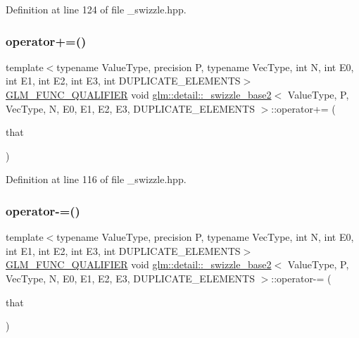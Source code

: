 Definition at line 124 of file \+\_\+swizzle.\+hpp.

\mbox{\label{structglm_1_1detail_1_1__swizzle__base2_a5e734b2e9da294d92bb347a3c7f44ded}} 
\subsubsection{\texorpdfstring{operator+=()}{operator+=()}}
{\footnotesize\ttfamily template$<$typename Value\+Type, precision P, typename Vec\+Type, int N, int E0, int E1, int E2, int E3, int D\+U\+P\+L\+I\+C\+A\+T\+E\+\_\+\+E\+L\+E\+M\+E\+N\+TS$>$ \\
\hyperlink{setup_8hpp_a33fdea6f91c5f834105f7415e2a64407}{G\+L\+M\+\_\+\+F\+U\+N\+C\+\_\+\+Q\+U\+A\+L\+I\+F\+I\+ER} void \hyperlink{structglm_1_1detail_1_1__swizzle__base2}{glm\+::detail\+::\+\_\+swizzle\+\_\+base2}$<$ Value\+Type, P, Vec\+Type, N, E0, E1, E2, E3, D\+U\+P\+L\+I\+C\+A\+T\+E\+\_\+\+E\+L\+E\+M\+E\+N\+TS $>$\+::operator+= (\begin{DoxyParamCaption}\item[{const Vec\+Type \&}]{that }\end{DoxyParamCaption})\hspace{0.3cm}{\ttfamily [inline]}}



Definition at line 116 of file \+\_\+swizzle.\+hpp.

\mbox{\label{structglm_1_1detail_1_1__swizzle__base2_ab583f399dc6685deee97bdd5126f433a}} 
\subsubsection{\texorpdfstring{operator-\/=()}{operator-=()}}
{\footnotesize\ttfamily template$<$typename Value\+Type, precision P, typename Vec\+Type, int N, int E0, int E1, int E2, int E3, int D\+U\+P\+L\+I\+C\+A\+T\+E\+\_\+\+E\+L\+E\+M\+E\+N\+TS$>$ \\
\hyperlink{setup_8hpp_a33fdea6f91c5f834105f7415e2a64407}{G\+L\+M\+\_\+\+F\+U\+N\+C\+\_\+\+Q\+U\+A\+L\+I\+F\+I\+ER} void \hyperlink{structglm_1_1detail_1_1__swizzle__base2}{glm\+::detail\+::\+\_\+swizzle\+\_\+base2}$<$ Value\+Type, P, Vec\+Type, N, E0, E1, E2, E3, D\+U\+P\+L\+I\+C\+A\+T\+E\+\_\+\+E\+L\+E\+M\+E\+N\+TS $>$\+::operator-\/= (\begin{DoxyParamCaption}\item[{const Vec\+Type \&}]{that }\end{DoxyParamCaption})\hspace{0.3cm}{\ttfamily [inline]}}



